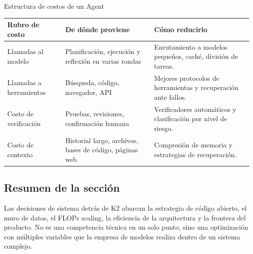 \begin{knowledgebox}{Estructura de costos de un Agent}
\begin{tabularx}{\textwidth}{p{}p{}X}
\toprule
Rubro de costo & De dónde proviene & Cómo reducirlo \\
\midrule
Llamadas al modelo & Planificación, ejecución y reflexión en varias rondas & Enrutamiento a modelos pequeños, caché, división de tareas. \\
Llamadas a herramientas & Búsqueda, código, navegador, API & Mejores protocolos de herramientas y recuperación ante fallos. \\
Costo de verificación & Pruebas, revisiones, confirmación humana & Verificadores automáticos y clasificación por nivel de riesgo. \\
Costo de contexto & Historial largo, archivos, bases de código, páginas web & Compresión de memoria y estrategias de recuperación. \\
\bottomrule
\end{tabularx}
\end{knowledgebox}

\subsection{Resumen de la sección}

Las decisiones de sistema detrás de K2 abarcan la estrategia de código abierto, el muro de datos, el FLOPs scaling, la eficiencia de la arquitectura y la frontera del producto. No es una competencia técnica en un solo punto, sino una optimización con múltiples variables que la empresa de modelos realiza dentro de un sistema complejo.
